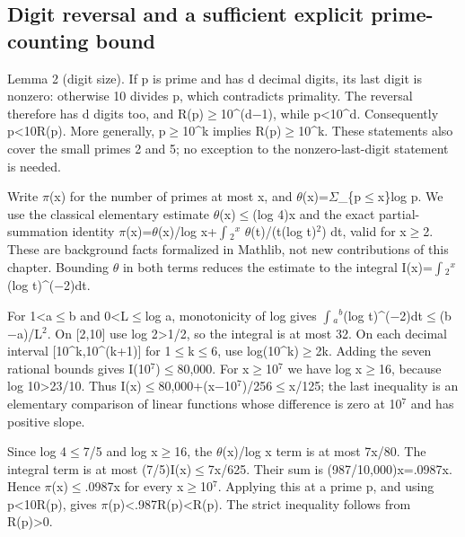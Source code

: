 \documentclass[11pt,a4paper]{article}
\begin{document}
\subsection{Digit reversal and a sufficient explicit prime-counting bound}
Lemma 2 (digit size). If p is prime and has d decimal digits, its last digit is nonzero: otherwise 10 divides p, which contradicts primality. The reversal therefore has d digits too, and R(p)\ensuremath{\geq}10\textasciicircum{}(d\ensuremath{-}1), while p<10\textasciicircum{}d. Consequently p<10R(p). More generally, p\ensuremath{\geq}10\textasciicircum{}k implies R(p)\ensuremath{\geq}10\textasciicircum{}k. These statements also cover the small primes 2 and 5; no exception to the nonzero-last-digit statement is needed.

Write \ensuremath{\pi}(x) for the number of primes at most x, and \ensuremath{\theta}(x)=\ensuremath{\Sigma}\_\{p\ensuremath{\leq}x\}log p. We use the classical elementary estimate \ensuremath{\theta}(x)\ensuremath{\leq}(log 4)x and the exact partial-summation identity \ensuremath{\pi}(x)=\ensuremath{\theta}(x)/log x+\ensuremath{\int}\ensuremath{_2}\ensuremath{^{x}} \ensuremath{\theta}(t)/(t(log t)\ensuremath{^2}) dt, valid for x\ensuremath{\geq}2. These are background facts formalized in Mathlib, not new contributions of this chapter. Bounding \ensuremath{\theta} in both terms reduces the estimate to the integral I(x)=\ensuremath{\int}\ensuremath{_2}\ensuremath{^{x}}(log t)\textasciicircum{}(\ensuremath{-}2)dt.

For 1<a\ensuremath{\leq}b and 0<L\ensuremath{\leq}log a, monotonicity of log gives \ensuremath{\int}\ensuremath{_{a}}\ensuremath{^{b}}(log t)\textasciicircum{}(\ensuremath{-}2)dt\ensuremath{\leq}(b\ensuremath{-}a)/L\ensuremath{^2}. On [2,10] use log 2>1/2, so the integral is at most 32. On each decimal interval [10\textasciicircum{}k,10\textasciicircum{}(k+1)] for 1\ensuremath{\leq}k\ensuremath{\leq}6, use log(10\textasciicircum{}k)\ensuremath{\geq}2k. Adding the seven rational bounds gives I(10\ensuremath{^7})\ensuremath{\leq}80,000. For x\ensuremath{\geq}10\ensuremath{^7} we have log x\ensuremath{\geq}16, because log 10>23/10. Thus I(x)\ensuremath{\leq}80,000+(x\ensuremath{-}10\ensuremath{^7})/256\ensuremath{\leq}x/125; the last inequality is an elementary comparison of linear functions whose difference is zero at 10\ensuremath{^7} and has positive slope.

Since log 4\ensuremath{\leq}7/5 and log x\ensuremath{\geq}16, the \ensuremath{\theta}(x)/log x term is at most 7x/80. The integral term is at most (7/5)I(x)\ensuremath{\leq}7x/625. Their sum is (987/10,000)x=.0987x. Hence \ensuremath{\pi}(x)\ensuremath{\leq}.0987x for every x\ensuremath{\geq}10\ensuremath{^7}. Applying this at a prime p, and using p<10R(p), gives \ensuremath{\pi}(p)<.987R(p)<R(p). The strict inequality follows from R(p)>0.
\end{document}
